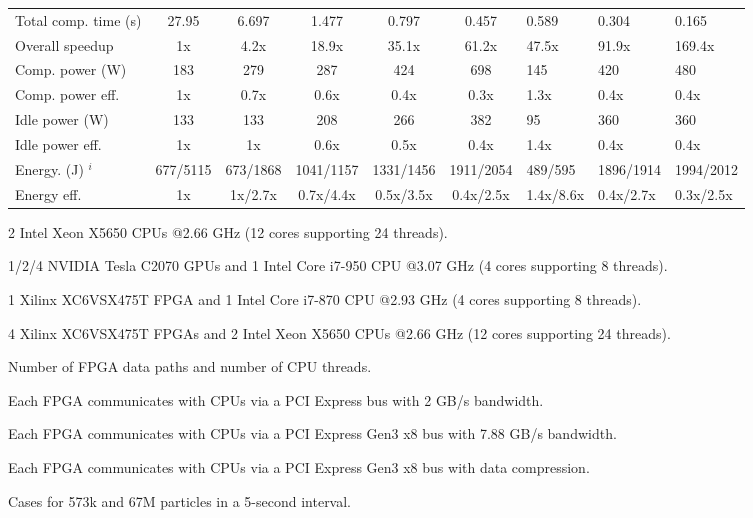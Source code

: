 \begin{table}[h]
\begin{spacing}{1.0}
\begin{threeparttable}
\begin{tabular}{| l || c c c c c g g g |}
		Total comp. time (s)  					& 27.95							& 6.697 					& 1.477						& 0.797						& 0.457						& 0.589 	& 0.304		& 0.165 	\\
		Overall speedup  						& 1x							& 4.2x	 					& 18.9x						& 35.1x						& 61.2x						& 47.5x 	& 91.9x		& 169.4x	\\
		\hline
		Comp. power (W) 	   					& 183							& 279 						& 287  						& 424						& 698						& 145 		& 420		& 480		\\
		Comp. power eff.						& 1x							& 0.7x						& 0.6x 						& 0.4x						& 0.3x						& 1.3x 		& 0.4x 		& 0.4x		\\
		Idle power (W)    						& 133							& 133						& 208   					& 266 						& 382						& 95		& 360		& 360		\\
		Idle power eff.					    	& 1x							& 1x						& 0.6x	 					& 0.5x						& 0.4x						& 1.4x 	& 0.4x		& 0.4x		\\
		\hline
		Energy. (J) $^i$						& 677/5115						& 673/1868 					& 1041/1157 				& 1331/1456					& 1911/2054					& 489/595 	& 1896/1914	& 1994/2012	\\
		Energy eff.								& 1x							& 1x/2.7x 					& 0.7x/4.4x 				& 0.5x/3.5x 				& 0.4x/2.5x					& 1.4x/8.6x	& 0.4x/2.7x	& 0.3x/2.5x\\
		\hline
		\end{tabular}
			\begin{tablenotes}
			\item[a] 2 Intel Xeon X5650 CPUs @2.66 GHz (12 cores supporting 24 threads).
			\item[b] 1/2/4 NVIDIA Tesla C2070 GPUs and 1 Intel Core i7-950 CPU @3.07 GHz (4 cores supporting 8 threads).
			\item[c] 1 Xilinx XC6VSX475T FPGA and 1 Intel Core i7-870 CPU @2.93 GHz (4 cores supporting 8 threads).
			\item[d] 4 Xilinx XC6VSX475T FPGAs and 2 Intel Xeon X5650 CPUs @2.66 GHz (12 cores supporting 24 threads).
			\item[e] Number of FPGA data paths and number of CPU threads.
			\item[f] Each FPGA communicates with CPUs via a PCI Express bus with 2 GB/s bandwidth.
			\item[g] Each FPGA communicates with CPUs via a PCI Express Gen3 x8 bus with 7.88 GB/s bandwidth.
			\item[h] Each FPGA communicates with CPUs via a PCI Express Gen3 x8 bus with data compression.
			\item[i] Cases for 573k and 67M particles in a 5-second interval.
			\end{tablenotes}
		\end{threeparttable}
\end{spacing}
\end{table}

